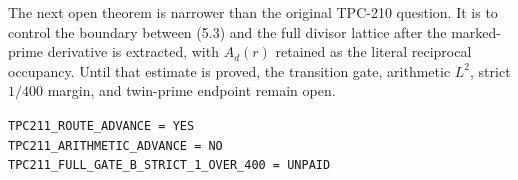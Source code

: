 \documentclass[11pt]{article}
\begin{document}
The next open theorem is narrower than the original TPC-210 question.  It is
to control the boundary between (5.3) and the full divisor lattice after the
marked-prime derivative is extracted, with $A_d(r)$ retained as the literal
reciprocal occupancy.  Until that estimate is proved, the transition gate,
arithmetic $L^2$, strict $1/400$ margin, and twin-prime endpoint remain open.

\begin{center}
\texttt{TPC211\_ROUTE\_ADVANCE = YES}\\
\texttt{TPC211\_ARITHMETIC\_ADVANCE = NO}\\
\texttt{TPC211\_FULL\_GATE\_B\_STRICT\_1\_OVER\_400 = UNPAID}
\end{center}



\end{document}
